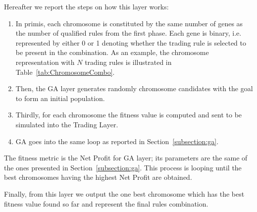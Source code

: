 \noindent Hereafter we report the steps on how this layer works:

\begin{enumerate}
\setlength\itemsep{0.3em}
\item In primis, each chromosome is constituted by the same number of genes as the number of qualified rules from the first phase. Each gene is binary, i.e. represented by either 0 or 1 denoting whether the trading rule is selected to be present in the combination. As an example, the chromosome representation with $N$ trading rules is illustrated in Table~\ref{tab:ChromosomeCombo}.
\item Then, the GA layer generates randomly chromosome candidates with the goal to form an initial population.
\item Thirdly, for each chromosome the fitness value is computed and sent to be simulated into the Trading Layer.
\item GA goes into the same loop as reported in Section~\ref{subsection:ga}.
\end{enumerate}

The fitness metric is the Net Profit for GA layer; its parameters are the same of the ones presented in Section~\ref{subsection:ga}. This process is looping until the best chromosomes having the highest Net Profit are obtained. 

Finally, from this layer we output the one best chromosome which has the best fitness value found so far and represent the final rules combination.